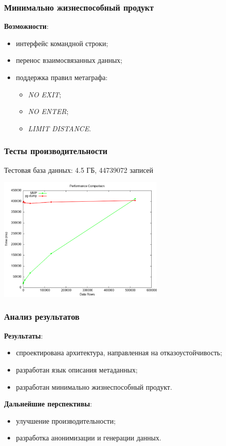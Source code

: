 \documentclass[pdf, hyperref={unicode}, aspectratio=169]{beamer}
\begin{document}
\begin{frame}
\frametitle{Минимально жизнеспособный продукт}
	\textbf{Возможности}:

	\begin{itemize}
		\item интерфейс командной строки;
		\item перенос взаимосвязанных данных;
		\item поддержка правил метаграфа:
		\begin{itemize}
			\item \textit{NO EXIT};
			\item \textit{NO ENTER};
			\item \textit{LIMIT DISTANCE}.
		\end{itemize}
	\end{itemize}
\end{frame}


\begin{frame}
\frametitle{Тесты производительности}
	Тестовая база данных: 4.5 ГБ, 44739072 записей

	\begin{center}
		\includegraphics[height = 6cm]{img/benchmark}
	\end{center}
\end{frame}


\begin{frame}
\frametitle{Анализ результатов}
	\textbf{Результаты}:

	\begin{itemize}
		\item спроектирована архитектура, направленная на отказоустойчивость;
		\item разработан язык описания метаданных;
		\item разработан минимально жизнеспособный продукт.
	\end{itemize}

	\textbf{Дальнейшие перспективы}:
	\begin{itemize}
		\item улучшение производительности;
		\item разработка анонимизации и генерации данных.
	\end{itemize}

\end{frame}
\end{document}
